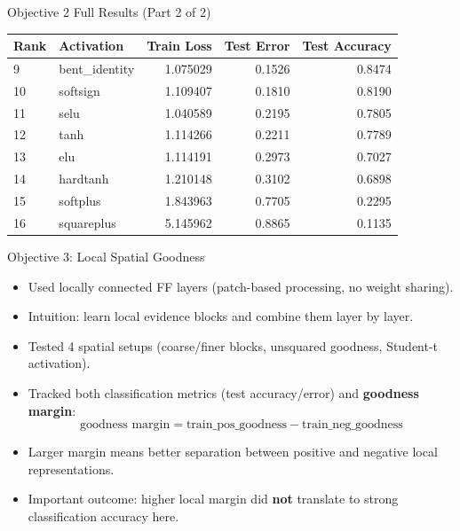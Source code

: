 \documentclass[aspectratio=169]{beamer}
\begin{document}
\begin{frame}{Objective 2 Full Results (Part 2 of 2)}
\scriptsize
\begin{table}[h]
\centering
\begin{tabular}{l l r r r}
\hline
Rank & Activation & Train Loss & Test Error & Test Accuracy \\
\hline
9 & bent\_identity & 1.075029 & 0.1526 & 0.8474 \\
10 & softsign & 1.109407 & 0.1810 & 0.8190 \\
11 & selu & 1.040589 & 0.2195 & 0.7805 \\
12 & tanh & 1.114266 & 0.2211 & 0.7789 \\
13 & elu & 1.114191 & 0.2973 & 0.7027 \\
14 & hardtanh & 1.210148 & 0.3102 & 0.6898 \\
15 & softplus & 1.843963 & 0.7705 & 0.2295 \\
16 & squareplus & 5.145962 & 0.8865 & 0.1135 \\
\hline
\end{tabular}
\end{table}
\normalsize
\end{frame}

\begin{frame}{Objective 3: Local Spatial Goodness}
\begin{itemize}
  \item Used locally connected FF layers (patch-based processing, no weight sharing).
  \item Intuition: learn local evidence blocks and combine them layer by layer.
  \item Tested 4 spatial setups (coarse/finer blocks, unsquared goodness, Student-t activation).
  \item Tracked both classification metrics (test accuracy/error) and \textbf{goodness margin}:
\[
\text{goodness margin} = \text{train\_pos\_goodness} - \text{train\_neg\_goodness}
\]
  \item Larger margin means better separation between positive and negative local representations.
  \item Important outcome: higher local margin did \textbf{not} translate to strong classification accuracy here.
\end{itemize}
\end{frame}
\end{document}
